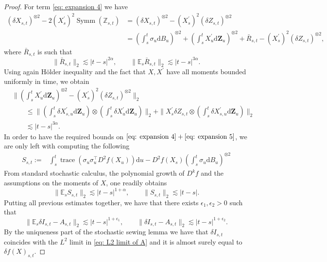 \documentclass[11pt,a4paper]{article}
\newcommand{\rd}{\mathrm{d}}
\theoremstyle{plain}
\begin{document}
\begin{proof}
    For term \eqref{eq: expansion 4} we have
    \begin{align*}
        (\delta X_{s,t})^{\otimes 2} - 2 (X^{\prime}_s)^2 \operatorname{Symm}(\mathbb{Z}_{s,t})
        &= (\delta X_{s,t})^{\otimes 2} - (X^{\prime}_s)^2 (\delta Z_{s,t})^{\otimes 2}\\
        & = \left(\int_s^t \sigma_u \rd B_u\right)^{\otimes 2} + \left(\int_s^t X^{\prime}_u \rd \mathbf{Z}_u \right)^{\otimes 2}
        + \bar{R}_{s,t} - (X^{\prime}_s)^{2}(\delta Z_{s,t})^{\otimes 2},
    \end{align*}
    where $\bar{R}_{s,t}$ is such that
    \begin{equation*}
        \|\bar{R}_{s,t}\|_{2} \lesssim |t-s|^{2\alpha},
        \qquad
        \|\mathbb{E}_s\bar{R}_{s,t}\|_{2} \lesssim |t-s|^{3\alpha}.
    \end{equation*}
    Using again H\"older inequality and the fact that $X,X^\prime$ have all moments bounded uniformly in time, we obtain
    \begin{align*}
        &\|\left(\int_s^t X^{\prime}_u \rd \mathbf{Z}_u \right)^{\otimes 2}
         - (X^{\prime}_s)^{2}(\delta Z_{s,t})^{\otimes 2}\|_{2}\\
        & \qquad \leq
        \|\left(\int_s^t \delta X^{\prime}_{s,u} \rd \mathbf{Z}_u \right)\otimes \left(\int_s^t \delta X^{\prime}_{u} \rd \mathbf{Z}_u \right)\|_{2}
         + \| X^{\prime}_s\delta Z_{s,t}\otimes 
         \left(\int_s^t \delta X^{\prime}_{s,u} \rd \mathbf{Z}_u
         \right)\|_{2}
         \\
         & \qquad \lesssim |t-s|^{3 \alpha}.
    \end{align*}
    In order to have the required bounds on $\eqref{eq: expansion 4}+\eqref{eq: expansion 5}$, we are only left with computing the following
    \begin{align*}
        S_{s,t} := &\int_s^t \operatorname{trace}(\sigma_u\sigma_u^{\top} D^2 f(X_u)) \rd u - D^2f(X_s)\left(\int_s^t \sigma_u \rd B_u\right)^{\otimes 2}
    \end{align*}
    From standard stochastic calculus, the polynomial growth of $D^kf$ and the assumptions on the moments of $X$, one readily obtains
    \begin{equation*}
        \|\mathbb{E}_s S_{s,t}\|_{2} \lesssim |t-s|^{1+\alpha},
        \qquad
        \|S_{s,t}\|_{2}
        \lesssim |t-s|.
    \end{equation*}
    Putting all previous estimates together, we have that there exists $\epsilon_1, \epsilon_2 > 0$ such that
    \begin{equation*}
        \|\mathbb{E}_s \delta I_{s,t}-A_{s,t}\|_{2} \lesssim |t-s|^{1+\epsilon_1},
        \qquad
        \|\delta I_{s,t}-A_{s,t}\|_{2}
        \lesssim |t-s|^{1+\epsilon_2}.
    \end{equation*}
    By the uniqueness part of the stochastic sewing lemma \cite[Theorem 2.9]{FHL21}
    we have that $\delta I_{s,t}$ coincides with the $L^2$ limit in \eqref{eq: L2 limit of A} and it is almost surely equal to $\delta f(X)_{s,t}$.
\end{proof}
\end{document}
